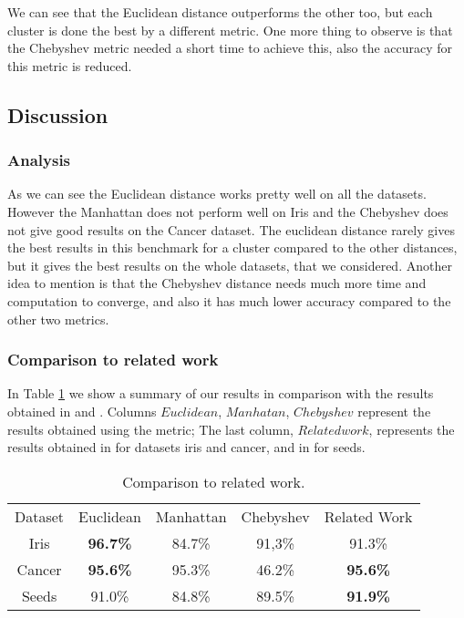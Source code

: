 \documentclass[conference]{IEEEtran}
\begin{document}
We can see that the Euclidean distance outperforms the other too, but each cluster is done the best by a different metric. One more thing to observe is that the Chebyshev metric needed a short time to achieve this, also the accuracy for this metric is reduced.

\subsection{Discussion}

\subsubsection{Analysis}

As we can see the Euclidean distance works pretty well on all the datasets. However the Manhattan does not perform well on Iris and the Chebyshev does not give good results on the Cancer dataset. The euclidean distance rarely gives the best results in this benchmark for a cluster compared to the other distances, but it gives the best results on the whole datasets, that we considered. Another idea to mention is that the Chebyshev distance needs much more time and computation to converge, and also it has much lower accuracy compared to the other two metrics.

\subsubsection{Comparison to related work}

In Table \ref{table_comparison} we show a summary of our results in comparison with the results obtained in \cite{cannon0approximate} and \cite{CompleteGradientClusteringAlgorithm}. Columns $Euclidean$, $Manhatan$, $Chebyshev$ represent the results obtained using the metric; The last column, $ Related work$, represents the results obtained in \cite{cannon0approximate} for datasets iris and cancer, and in \cite{CompleteGradientClusteringAlgorithm} for seeds.

\begin{table}[!t]
\renewcommand{\arraystretch}{1.3}
\label{table_comparison}
\centering
\begin{tabular}{|c|c|c|c|c|}
\cline{1-5}
 Dataset & Euclidean & Manhattan & Chebyshev & Related Work \\
\cline{1-5}
Iris & \bf{96.7\%} & 84.7\% & 91,3\% & 91.3\% \\
\hline
Cancer & \bf{95.6\%} & 95.3\% & 46.2\% & \bf{95.6\%} \\
\hline
Seeds & 91.0\% & 84.8\% & 89.5\% & \bf{91.9\%} \\
\hline
\end{tabular}
\caption{Comparison to related work.}
\end{table}
\end{document}
